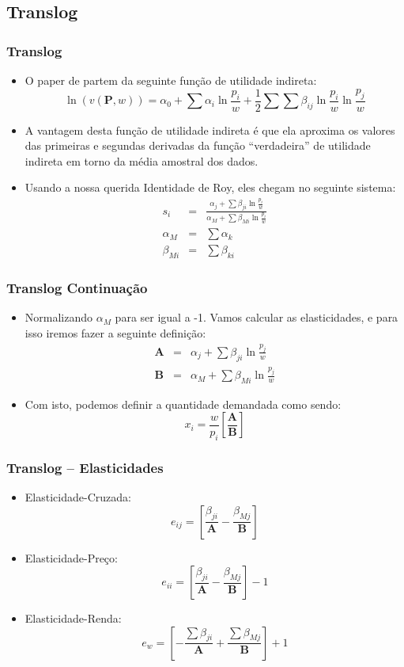 \documentclass{beamer}
\begin{document}
\subsection{Translog}

\begin{frame}\frametitle{Translog}

\begin{itemize}
\item O paper de \citet{ChristensenTLUtil75} partem da seguinte função de utilidade indireta:
\[
\ln(v(\mathbf{P},w))=\alpha_{0}+\sum\alpha_{i}\ln\frac{p_{i}}{w}+\frac{1}{2}\sum\sum\beta_{ij}\ln\frac{p_{i}}{w}\ln\frac{p_{j}}{w}
\]
\item A vantagem desta função de utilidade indireta é que ela aproxima os valores das primeiras e segundas derivadas da função ``verdadeira'' de utilidade indireta em torno da média amostral dos dados.
\item Usando a nossa querida Identidade de Roy, eles chegam no seguinte sistema:
\begin{eqnarray*}
s_{i} & = & \frac{\alpha_{j}+\sum\beta_{ji}\ln\frac{p_{i}}{w}}{\alpha_{M}+\sum\beta_{Mi}\ln\frac{p_{i}}{w}}\\
\alpha_{M} & = & \sum\alpha_{k}\\
\beta_{Mi} & = & \sum\beta_{ki}
\end{eqnarray*}
\end{itemize}
\end{frame}

\begin{frame}\frametitle{Translog Continuação}

\begin{itemize}
\item Normalizando $\alpha_{M}$ para ser igual a -1. Vamos calcular as elasticidades, e para isso iremos fazer a seguinte definição:
\begin{eqnarray*}
\mathbf{A} & = & \alpha_{j}+\sum\beta_{ji}\ln\frac{p_{j}}{w}\\
\mathbf{B} & = & \alpha_{M}+\sum\beta_{Mi}\ln\frac{p_{j}}{w}
\end{eqnarray*}
\item Com isto, podemos definir a quantidade demandada como sendo:
\[
x_{i}=\frac{w}{p_{i}}\left[\frac{\mathbf{A}}{\mathbf{B}}\right]
\]
\end{itemize}
\end{frame}

\begin{frame}\frametitle{Translog -- Elasticidades}

\begin{itemize}
\item Elasticidade-Cruzada:
\[
e_{ij}=\left[\frac{\beta_{ji}}{\mathbf{A}}-\frac{\beta_{Mj}}{\mathbf{B}}\right]
\]
\item Elasticidade-Preço:
\[
e_{ii}=\left[\frac{\beta_{ji}}{\mathbf{A}}-\frac{\beta_{Mj}}{\mathbf{B}}\right]-1
\]
\item Elasticidade-Renda:
\[
e_{w}=\left[-\frac{\sum\beta_{ji}}{\mathbf{A}}+\frac{\sum\beta_{Mj}}{\mathbf{B}}\right]+1
\]
\end{itemize}
\end{frame}
\end{document}
